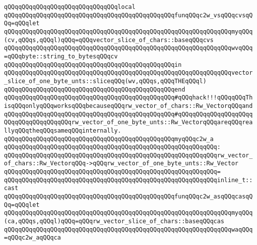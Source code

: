 \newline
\verb|qQQqqQQqqQQqqQQqqQQqqQQqqQQqqQQqlocal|\newline
\verb|qQQqqQQqqQQqqQQqqQQqqQQqqQQqqQQqqQQqqQQqqQQqqQQqfunqQQqc2w_vsqQQqcvsqQQq=qQQqlet|\newline
\verb|qQQqqQQqqQQqqQQqqQQqqQQqqQQqqQQqqQQqqQQqqQQqqQQqqQQqqQQqqQQqqQQqmyqQQq(cv,qQQqs,qQQql)qQQq=qQQqvector_slice_of_chars::baseqQQqcvs|\newline
\verb|qQQqqQQqqQQqqQQqqQQqqQQqqQQqqQQqqQQqqQQqqQQqqQQqqQQqqQQqqQQqqQQqwvqQQq=qQQqbyte::string_to_bytesqQQqcv|\newline
\verb|qQQqqQQqqQQqqQQqqQQqqQQqqQQqqQQqqQQqqQQqqQQqqQQqin|\newline
\verb|qQQqqQQqqQQqqQQqqQQqqQQqqQQqqQQqqQQqqQQqqQQqqQQqqQQqqQQqqQQqqQQqvector_slice_of_one_byte_unts::sliceqQQq(wv,qQQqs,qQQqTHEqQQql)|\newline
\verb|qQQqqQQqqQQqqQQqqQQqqQQqqQQqqQQqqQQqqQQqqQQqqQQqend|\newline
\newline
\verb|qQQqqQQqqQQqqQQqqQQqqQQqqQQqqQQqqQQqqQQqqQQqqQQq#qQQqhack!!!qQQqqQQqThisqQQqonlyqQQqworksqQQqbecauseqQQqrw_vector_of_chars::Rw_VectorqQQqand|\newline
\verb|qQQqqQQqqQQqqQQqqQQqqQQqqQQqqQQqqQQqqQQqqQQqqQQq#qQQqqQQqqQQqqQQqqQQqqQQqqQQqqQQqqQQqqQQqrw_vector_of_one_byte_unts::Rw_VectorqQQqareqQQqreallyqQQqtheqQQqsameqQQqinternally.|\newline
\verb|qQQqqQQqqQQqqQQqqQQqqQQqqQQqqQQqqQQqqQQqqQQqqQQqmyqQQqc2w_a|\newline
\verb|qQQqqQQqqQQqqQQqqQQqqQQqqQQqqQQqqQQqqQQqqQQqqQQqqQQqqQQqqQQq:|\newline
\verb|qQQqqQQqqQQqqQQqqQQqqQQqqQQqqQQqqQQqqQQqqQQqqQQqqQQqqQQqqQQqrw_vector_of_chars::Rw_VectorqQQq->qQQqrw_vector_of_one_byte_unts::Rw_Vector|\newline
\verb|qQQqqQQqqQQqqQQqqQQqqQQqqQQqqQQqqQQqqQQqqQQqqQQqqQQqqQQqqQQq=|\newline
\verb|qQQqqQQqqQQqqQQqqQQqqQQqqQQqqQQqqQQqqQQqqQQqqQQqqQQqqQQqqQQqinline_t::cast|\newline
\newline
\verb|qQQqqQQqqQQqqQQqqQQqqQQqqQQqqQQqqQQqqQQqqQQqqQQqfunqQQqc2w_asqQQqcasqQQq=qQQqlet|\newline
\verb|qQQqqQQqqQQqqQQqqQQqqQQqqQQqqQQqqQQqqQQqqQQqqQQqqQQqqQQqqQQqqQQqmyqQQq(ca,qQQqs,qQQql)qQQq=qQQqrw_vector_slice_of_chars::baseqQQqcas|\newline
\verb|qQQqqQQqqQQqqQQqqQQqqQQqqQQqqQQqqQQqqQQqqQQqqQQqqQQqqQQqqQQqqQQqwaqQQq=qQQqc2w_aqQQqca|\newline
